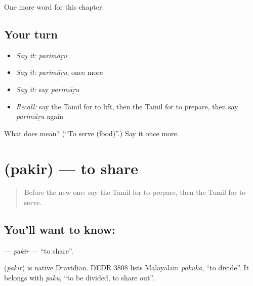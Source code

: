 \begin{grammarlens}[title={What you've built}]
One more word for this chapter.
\end{grammarlens}

\subsection*{Your turn}
\begin{itemize}
\raggedright
  \item \emph{Say it:} \emph{parimāṟu}
  \item \emph{Say it:} \emph{parimāṟu}, once more
  \item \emph{Say it:} say \emph{parimāṟu}
  \item \emph{Recall:} say the Tamil for to lift, then the Tamil for to prepare, then say \emph{parimāṟu} again
\end{itemize}

\begin{tcolorbox}[breakable,colback=teal!4,colframe=teal!35!black,title={Before you move on}]
What does  mean? (\textquotedblleft{}To serve (food)\textquotedblright{}.) Say it once more.
\end{tcolorbox}
\section[\texorpdfstring{\ta{பகிர்} (pakir)}{பகிர் (pakir)}]{ (pakir) — to share}

\label{lesson:TA-C163-pakir}



\begin{quote}
Before the new one: say the Tamil for to prepare, then the Tamil for to serve.
\end{quote}

\subsection*{You'll want to know: }
\textbf{} — \emph{pakir} — \textquotedblleft{}to share\textquotedblright{}.

\begin{cousinweb}
\textbf{} (\emph{pakir}) is native Dravidian. DEDR 3808 lists Malayalam \emph{pakuka}, \textquotedblleft{}to divide\textquotedblright{}. It belongs with \emph{paku}, \textquotedblleft{}to be divided, to share out\textquotedblright{}.
\end{cousinweb}

